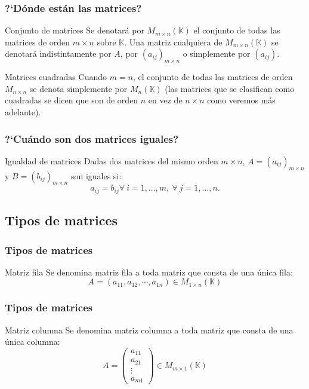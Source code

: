 \documentclass[12pt]{article}
\begin{document}
\begin{frame}
  \frametitle{?`D\'onde est\'an las matrices?}
  \begin{block}{Conjunto de matrices}
Se denotar\'a por $M_{m\times n}(\mathbb{K})$ el conjunto de todas las matrices de orden $m\times n$ sobre $\mathbb{K}$. Una matriz cualquiera de $M_{m\times n}(\mathbb{K})$ se denotar\'a indistintamente por $A$, por $(a_{ij})_{m\times n}$ o simplemente por $(a_{ij})$. 
  \end{block}

  \begin{block}{Matrices cuadradas}
 Cuando $m = n$, el conjunto de todas las matrices de orden $M_{n\times n}$ se denota simplemente por $M_{n}(\mathbb{K})$ (las matrices que se clasifican como cuadradas se dicen que son de orden $n$ en vez de $n \times n$ como veremos m\'as adelante).
  \end{block}
\end{frame}




\begin{frame}
  \frametitle{?`Cu\'ando son dos matrices iguales?}
  \begin{block}{Igualdad de matrices}
Dadas dos matrices del mismo orden $m \times n$, $A = (a_{ij} )_{m\times n}$ y $B = (b_{ij} )_{m\times n}$ son iguales si:
\[a_{ij} = b_{ij} \forall\  i = 1,...,m, \ \forall\ j = 1,...,n.\]
  \end{block}

 \end{frame}


\subsection{Tipos de matrices}

 \begin{frame}
  \frametitle{Tipos de matrices}
  \begin{block}{Matriz fila}
Se denomina matriz fila a toda matriz que consta de una \'unica fila:
\[ A = (a_{11}, a_{12}, \cdots, a_{1n})\in M_{1\times n} (\mathbb{K})\]
  \end{block}

 \end{frame}

\begin{frame}
  \frametitle{Tipos de matrices}
  \begin{block}{Matriz columna}
Se denomina matriz columna a toda matriz que consta de una \'unica columna:
\[ A = \left(\begin{matrix} %
      a_{11}  \\
      a_{21} \\
      \vdots \\
      a_{m1}
   \end{matrix}\right) \in M_{m\times 1} (\mathbb{K})\]
  \end{block}

 \end{frame}
\end{document}
